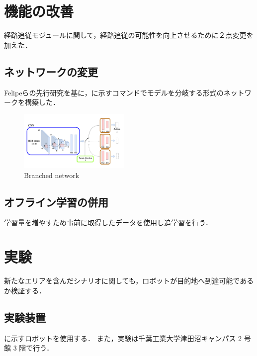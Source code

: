 \documentclass[10pt]{jarticle}
\begin{document}
    \section{機能の改善}%
    経路追従モジュールに関して，経路追従の可能性を向上させるために２点変更を加えた．
    \subsection{ネットワークの変更}
    Felipeら\cite{Codevilla2018}の先行研究を基に，に示すコマンドでモデルを分岐する形式のネットワークを構築した．
    \begin{center}
        \begin{figure}[h]
            \includegraphics[width=0.475\textwidth]{./fig/ishiguro/branched.pdf}
            \caption{Branched network}
            \label{fig:branched}
        \end{figure}
    \end{center}

    \subsection{オフライン学習の併用}
    学習量を増やすため事前に取得したデータを使用し追学習を行う．

    \section{実験}%
    新たなエリアを含んだシナリオに関しても，ロボットが目的地へ到達可能であるか検証する．
    \subsection{実験装置}
    に示すロボットを使用する．
    また，実験は千葉工業大学津田沼キャンパス 2 号館 3 階で行う．
    
\end{document}
